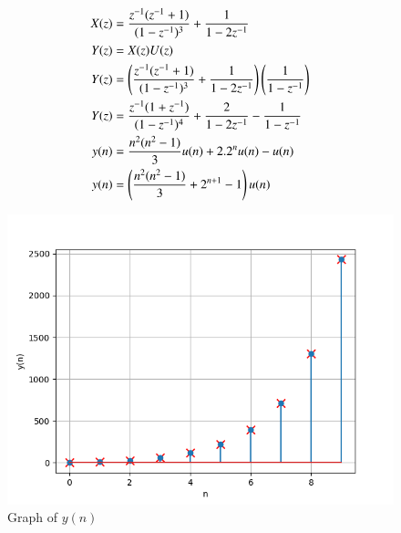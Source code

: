 \documentclass[a4,12pt,onecolumn]{IEEEtran}
\begin{document}
\begin{align}
X(z)&=\frac{z^{-1}(z^{-1} + 1)}{(1 - z^{-1})^3} +\frac{1}{1 - 2z^{-1}}\\
Y(z)&=X(z)U(z)\\
Y(z)&=\left(\frac{z^{-1}(z^{-1} + 1)}{(1 - z^{-1})^3} +\frac{1}{1 - 2z^{-1}}\right)\left(\frac{1}{1-z^{-1}}\right)\\
Y(z)&=\frac{z^{-1}(1+z^{-1})}{(1-z^{-1})^4}+\frac{2}{1-2z^{-1}}-\frac{1}{1-z^{-1}}\\
y(n)&=\frac{n^2(n^2-1)}{3}u(n)+2.2^nu(n)-u(n)\\
y(n)&=\left(\frac{n^2(n^2-1)}{3}+2^{n+1}-1\right)u(n)
\end{align}
\begin{figure}[ht]
    \centering
    \includegraphics[width=\columnwidth]{figs/main.png}
    \caption{Graph of $y(n)$ }
\end{figure}
\end{document}

